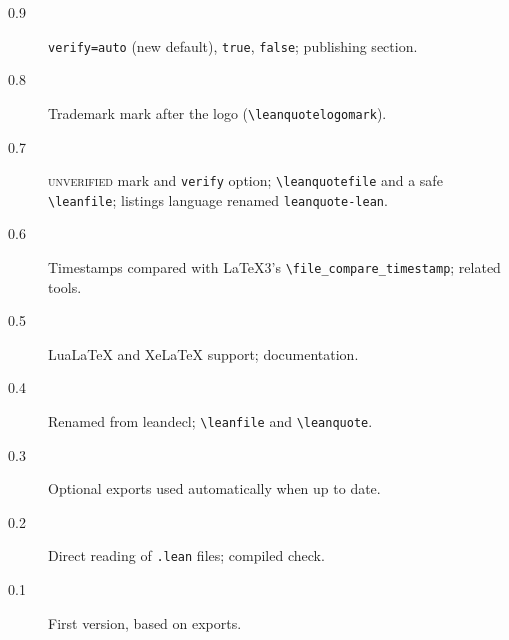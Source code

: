 \documentclass[11pt]{article}
\newcommand{\cs}[1]{\texttt{\textbackslash #1}}
\newcommand{\opt}[1]{\texttt{#1}}
\begin{document}
\begin{description}
\item[0.9] \opt{verify=auto} (new default), \opt{true}, \opt{false}; publishing section.
\item[0.8] Trademark mark after the logo (\cs{leanquotelogomark}).
\item[0.7] \textsc{unverified} mark and \opt{verify} option; \cs{leanquotefile} and a safe \cs{leanfile}; listings language renamed \texttt{leanquote-lean}.
\item[0.6] Timestamps compared with \LaTeX3's \verb|\file_compare_timestamp|; related tools.
\item[0.5] Lua\LaTeX{} and Xe\LaTeX{} support; documentation.
\item[0.4] Renamed from \textsf{leandecl}; \cs{leanfile} and \cs{leanquote}.
\item[0.3] Optional exports used automatically when up to date.
\item[0.2] Direct reading of \texttt{.lean} files; compiled check.
\item[0.1] First version, based on exports.
\end{description}
\endgroup
\end{document}
